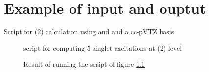\chapter{Example of \molsturm input and ouptut}
\label{apx:MolsturmIO}

Script for \ADC(2) calculation using \molsturm and \adcman
and a cc-pVTZ basis


\begin{figure}[htpb]
	\centering
	\begin{minipage}{0.58\textwidth}
	
	\end{minipage}
	\caption[\python script for computing 5 singlet excitations at \ADC(2) level]{
		\python script for computing 5 singlet excitations at \ADC(2) level
	}
	\label{fig:molsturmInput}
\end{figure}

\begin{figure}[htpb]
	\centering
	\begin{minipage}{0.58\textwidth}
	
	\end{minipage}
	\caption{
		Result of running the script of figure \ref{fig:molsturmInput}
	}
	\label{fig:molsturmOutput}
\end{figure}
